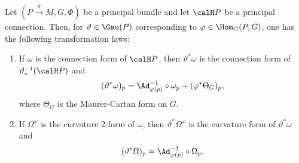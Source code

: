 \begin{prop}[{{\cite[Prop.~1.8.7]{RS2}}}]
    Let $(P\overset{\pi}{\to}M,G,\Phi)$ be a principal bundle and let $\calH P$ be a principal connection. Then, for $\vartheta\in \Gau(P)$ corresponding to $\varphi\in \Hom_G(P,G)$, one has the following transformation laws:
    \begin{enumerate}
        \item If $\omega$ is the connection form of $\calH P$, then $\vartheta^\ast \omega$ is the connection form of $\vartheta_\ast^{-1}(\calH P)$ and 
        \[(\vartheta^\ast\omega)_p=\Ad_{\varphi(p)}^{-1}\circ\omega_p+(\varphi^\ast\Theta_G)_p,\label{eq 1.8.7 RS2}\]
        where $\Theta_G$ is the Maurer-Cartan form on $G$.

        \item If $\Omega^\omega$ is the curvature $2$-form of $\omega$, then $\vartheta^\ast\Omega^\omega$ is the curvature form of $\vartheta^\ast\omega$ and
        \[(\vartheta^\ast\Omega)_p=\Ad_{\varphi(p)}^{-1}\circ\Omega_p.\label{eq 1.8.8 RS2}\]
    \end{enumerate}
\end{prop}
